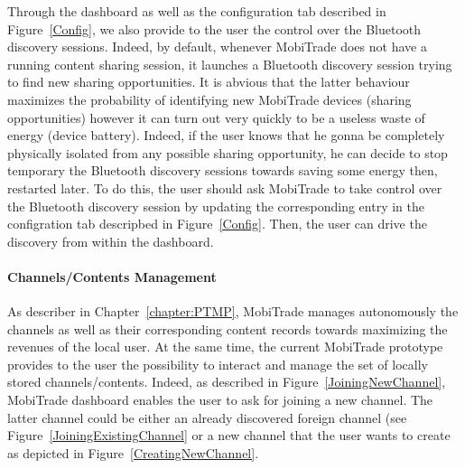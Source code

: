 Through the dashboard as well as the configuration tab described in Figure~\ref{Config}, we also provide to the user the control over the Bluetooth discovery sessions. Indeed, by default, whenever MobiTrade does not have a running content sharing session, it launches a Bluetooth discovery session trying to find new sharing opportunities. It is abvious that the latter behaviour maximizes the probability of identifying new MobiTrade devices (sharing opportunities) however it can turn out very quickly to be a useless waste of energy (device battery). Indeed, if the user knows that he gonna be completely physically isolated from any possible sharing opportunity, he can decide to stop temporary the Bluetooth discovery sessions towards saving some energy then, restarted later. To do this, the user should ask MobiTrade to take control over the Bluetooth discovery session by updating the corresponding entry in the configration tab descripbed in Figure~\ref{Config}. Then, the user can drive the discovery from within the dashboard.

\paragraph{Channels/Contents Management}

As describer in Chapter~\ref{chapter:PTMP}, MobiTrade manages autonomously the channels as well as their corresponding content records towards maximizing the revenues of the local user. At the same time, the current MobiTrade prototype provides to the user the possibility to interact and manage the set of locally stored channels/contents. Indeed, as described in Figure~\ref{JoiningNewChannel}, MobiTrade dashboard enables the user to ask for joining a new channel. The latter channel could be either 
an already discovered foreign channel (see Figure~\ref{JoiningExistingChannel} or a new channel that the user wants to create as depicted in Figure~\ref{CreatingNewChannel}.

